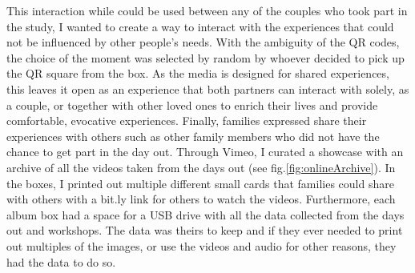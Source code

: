 This interaction while could be used between any of the couples who took part in the study, I wanted to create a way to interact with the experiences that could not be influenced by other people’s needs. With the ambiguity of the QR codes, the choice of the moment was selected by random by whoever decided to pick up the QR square from the box. As the media is designed for shared experiences, this leaves it open as an experience that both partners can interact with solely, as a couple, or together with other loved ones to enrich their lives and provide comfortable, evocative experiences. Finally, families expressed share their experiences with others such as other family members who did not have the chance to get part in the day out. Through Vimeo, I curated a showcase with an archive of all the videos taken from the days out (see fig.\ref{fig:onlineArchive}). In the boxes, I printed out multiple different small cards that families could share with others with a bit.ly link for others to watch the videos. Furthermore, each album box had a space for a USB drive with all the data collected from the days out and workshops. The data was theirs to keep and if they ever needed to print out multiples of the images, or use the videos and audio for other reasons, they had the data to do so. 

